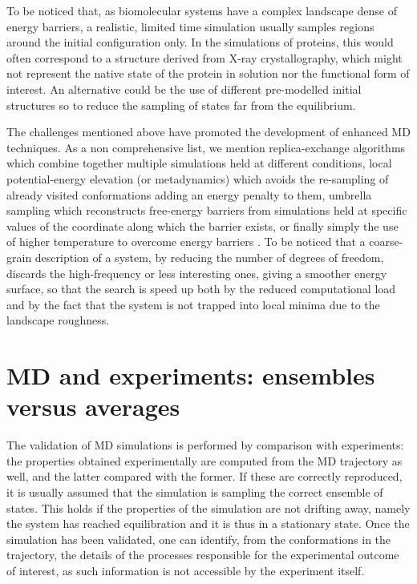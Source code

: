 To be noticed that, as biomolecular systems have a complex landscape dense of energy barriers, a realistic, limited time simulation usually samples regions around the initial configuration only.
%
In the simulations of proteins, this would often correspond to a structure derived from X-ray crystallography, which might not represent the native state of the protein in solution nor the functional form of interest.
%
An alternative could be the use of different pre-modelled initial structures so to reduce the sampling of states far from the equilibrium.

The challenges mentioned above have promoted the development of enhanced MD techniques. As a non comprehensive list, we mention replica-exchange algorithms \citep{Okamoto2004} which combine together multiple simulations held at different conditions, local potential-energy elevation (or metadynamics) \citep{Huber1994,Laio2002} which avoids the re-sampling of already visited conformations adding an energy penalty to them, umbrella sampling \citep{Torrie1977} which reconstructs free-energy barriers from simulations held at specific values of the coordinate along which the barrier exists, or finally simply the use of higher temperature to overcome energy barriers \citep{Kirkpatrick1983}.
%
To be noticed that a coarse-grain description of a system, by reducing the number of degrees of freedom, discards the high-frequency or less interesting ones, giving a smoother energy surface, so that the search is speed up both by the reduced computational load and by the fact that the system is not trapped into local minima due to the landscape roughness.


\section{MD and experiments: ensembles versus averages}
The validation of MD simulations is performed by comparison with experiments: the properties obtained experimentally are computed from the MD trajectory as well, and the latter compared with the former. If these are correctly reproduced, it is usually assumed that the simulation is sampling the correct ensemble of states. This holds if the properties of the simulation are not drifting away, namely the system has reached equilibration and it is thus in a stationary state.
%
Once the simulation has been validated, one can identify, from the conformations in the trajectory, the details of the processes responsible for the experimental outcome of interest, as such information is not accessible by the experiment itself.

